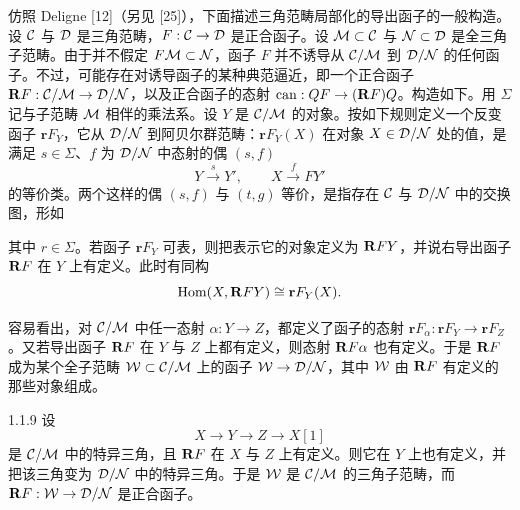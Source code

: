 仿照 Deligne [12]（另见 [25]），下面描述三角范畴局部化的导出函子的一般构造。设 $\mathcal{C}$ 与 $\mathcal{D}$ 是三角范畴，$F:\mathcal{C}\to\mathcal{D}$ 是正合函子。设 $\mathcal{M}\subset\mathcal{C}$ 与 $\mathcal{N}\subset\mathcal{D}$ 是全三角子范畴。由于并不假定 $F\mathcal{M}\subset\mathcal{N}$，函子 $F$ 并不诱导从 $\mathcal{C}/\mathcal{M}$ 到 $\mathcal{D}/\mathcal{N}$ 的任何函子。不过，可能存在对诱导函子的某种典范逼近，即一个正合函子 $\mathbf{R} F:\mathcal{C}/\mathcal{M}\to\mathcal{D}/\mathcal{N}$，以及正合函子的态射 $\mathrm{can}:QF\to(\mathbf{R} F)Q$。构造如下。用 $\Sigma$ 记与子范畴 $\mathcal{M}$ 相伴的乘法系。设 $Y$ 是 $\mathcal{C}/\mathcal{M}$ 的对象。按如下规则定义一个反变函子 $\mathbf{r}F_Y$，它从 $\mathcal{D}/\mathcal{N}$ 到阿贝尔群范畴：$\mathbf{r}F_Y(X)$ 在对象 $X\in\mathcal{D}/\mathcal{N}$ 处的值，是满足 $s\in\Sigma$、$f$ 为 $\mathcal{D}/\mathcal{N}$ 中态射的偶 $(s,f)$
\begin{equation*}
Y\xrightarrow{\ s\ }Y',\qquad X\xrightarrow{\ f\ }FY'
\end{equation*}
的等价类。两个这样的偶 $(s,f)$ 与 $(t,g)$ 等价，是指存在 $\mathcal{C}$ 与 $\mathcal{D}/\mathcal{N}$ 中的交换图，形如

其中 $r\in\Sigma$。若函子 $\mathbf{r}F_Y$ 可表，则把表示它的对象定义为 $\mathbf{R} FY$，并说右导出函子 $\mathbf{R} F$ 在 $Y$ 上有定义。此时有同构
\begin{equation*}
\operatorname{Hom}(X,\mathbf{R} FY)\cong\mathbf{r}F_Y(X).
\end{equation*}


容易看出，对 $\mathcal{C}/\mathcal{M}$ 中任一态射 $\alpha:Y\to Z$，都定义了函子的态射 $\mathbf{r}F_\alpha:\mathbf{r}F_Y\to\mathbf{r}F_Z$。又若导出函子 $\mathbf{R} F$ 在 $Y$ 与 $Z$ 上都有定义，则态射 $\mathbf{R} F\alpha$ 也有定义。于是 $\mathbf{R} F$ 成为某个全子范畴 $\mathcal{W}\subset\mathcal{C}/\mathcal{M}$ 上的函子 $\mathcal{W}\to\mathcal{D}/\mathcal{N}$，其中 $\mathcal{W}$ 由 $\mathbf{R} F$ 有定义的那些对象组成。

\begin{proposition}[{{[}12{]}}]{1.1.9}
设
\begin{equation*}
X\to Y\to Z\to X[1]
\end{equation*}
是 $\mathcal{C}/\mathcal{M}$ 中的特异三角，且 $\mathbf{R} F$ 在 $X$ 与 $Z$ 上有定义。则它在 $Y$ 上也有定义，并把该三角变为 $\mathcal{D}/\mathcal{N}$ 中的特异三角。于是 $\mathcal{W}$ 是 $\mathcal{C}/\mathcal{M}$ 的三角子范畴，而 $\mathbf{R} F:\mathcal{W}\to\mathcal{D}/\mathcal{N}$ 是正合函子。
\end{proposition}

